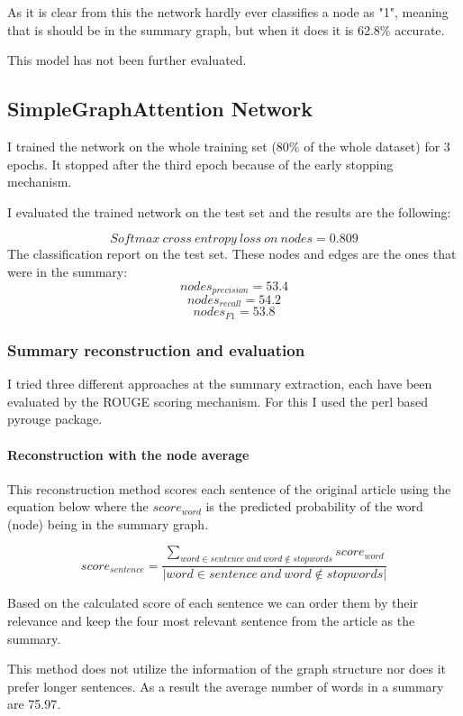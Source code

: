 As it is clear from this the network hardly ever classifies a node as "1", meaning that is should be in the summary graph, but when it does it is 62.8\% accurate.

This model has not been further evaluated.

\subsection{SimpleGraphAttention Network}
I trained the network on the whole training set (80\% of the whole dataset) for 3 epochs. It stopped after the third epoch because of the early stopping mechanism.

I evaluated the trained network on the test set and the results are the following:

\[Softmax\ cross\ entropy\ loss\ on\ nodes = 0.809\]
The classification report on the test set. These nodes and edges are the ones that were in the summary:
\[nodes_{precision} = 53.4\]
\[nodes_{recall} =54.2\]
\[nodes_{F1} = 53.8\]

\subsubsection{Summary reconstruction and evaluation}
I tried three different approaches at the summary extraction, each have been evaluated by the ROUGE scoring mechanism. For this I used the perl based pyrouge package.

\paragraph{Reconstruction with the node average}

This reconstruction method scores each sentence of the original article using the equation below where the \(score_{word}\) is the predicted probability of the word (node) being in the summary graph.

\[score_{sentence} = \frac{\sum_{word \in sentence\ and\ word \notin stopwords} score_{word}}{|word \in sentence\ and\ word \notin stopwords|}\]

Based on the calculated score of each sentence we can order them by their relevance and keep the four most relevant sentence from the article as the summary.

This method does not utilize the information of the graph structure nor does it prefer longer sentences. As a result the average number of words in a summary are 75.97.

